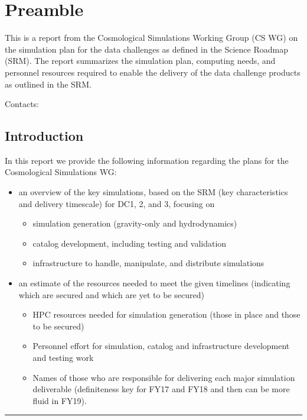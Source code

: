 \section{Preamble}
\resetnumbering
\label{sec:preamble}

This is a report from the Cosmological Simulations Working Group (CS WG) on the simulation plan for the data challenges as defined in the Science Roadmap (SRM). The report summarizes the simulation plan, computing needs, and personnel resources required to enable the delivery of the data challenge products as outlined in the SRM.

\vspace{\baselineskip}

Contacts: 



\subsection{Introduction}
\label{sec:preamble:introduction}

In this report we provide the following information regarding the plans for the Cosmological Simulations WG:

\begin{itemize}
   \item    an overview of the key simulations, based on the SRM (key characteristics and delivery timescale) for DC1, 2, and 3, focusing on
     \begin{itemize}
        \item        simulation generation (gravity-only and hydrodynamics)
        \item        catalog development, including testing and validation
        \item        infrastructure to handle, manipulate, and distribute simulations
     \end{itemize}
   \item    an estimate of the resources needed to meet the given timelines (indicating which are secured and which are yet to be secured)
     \begin{itemize}
        \item        HPC resources needed for simulation generation (those in place and those to be secured)
        \item        Personnel effort for simulation, catalog and infrastructure development and testing work
        \item        Names of those who are responsible for delivering each major simulation deliverable (definiteness key for FY17 and FY18 and then can be more fluid in FY19).
     \end{itemize}
\end{itemize}


\vspace{\baselineskip}
\hrule
\clearpage
